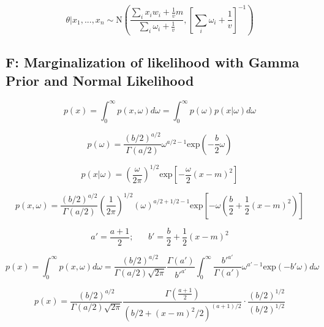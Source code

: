 \documentclass[12pt]{article}
\begin{document}
        \begin{equation}
            \theta|x_1,...,x_n \sim \text{N}\left( \frac{\sum_i x_i w_i + \frac{1}{v}m}{\sum_i \omega_i + \frac{1}{v}}, \left [ \sum_i \omega_i + \frac{1}{v}\right]^{-1}\right)
        \end{equation}


    \subsection*{F: Marginalization of likelihood with Gamma Prior and Normal Likelihood}

        \begin{equation}
              p(x) = \int_0^{\infty} p(x,\omega)d\omega = \int_0^{\infty} p(\omega)p(x|\omega)d\omega
        \end{equation}

        \begin{equation}
              p(\omega) = \frac{(b/2)^{a/2}}{\Gamma(a/2)}{\omega}^{a/2-1} \text{exp}\left (-\frac{b}{2}\omega \right)
        \end{equation}

        \begin{equation}
              p(x|\omega) = \left( \frac{\omega}{2 \pi}\right)^{1/2} \text{exp} \left [ -\frac{\omega}{2}(x - m)^2\right]
        \end{equation}

        \begin{equation}
              p(x,\omega) = \frac{(b/2)^{a/2}}{\Gamma(a/2)}  \left( \frac{1}{2 \pi}\right)^{1/2} (\omega)^{a/2+1/2-1}\text{exp}\left[-\omega \left( \frac{b}{2} + \frac{1}{2}(x - m)^2\right) \right]
        \end{equation}

        \begin{equation}
              a' = \frac{a+1}{2}; \hspace{20pt} b'= \frac{b}{2} + \frac{1}{2}(x-m)^2
        \end{equation}

        \begin{equation}
              p(x) = \int_0^{\infty}p(x, \omega) d\omega = \frac{(b/2)^{a/2}}{\Gamma(a/2) \sqrt{2\pi}} \frac{\Gamma(a')}{b'^{a'}} \int_0^{\infty} \frac{b'^{a'}}{\Gamma(a')}\omega^{a'-1} \text{exp}(-b' \omega) d\omega
        \end{equation}

        \begin{equation}
              p(x) = \frac{(b/2)^{a/2}}{\Gamma(a/2) \sqrt{2\pi}} \frac{\Gamma(\frac{a+1}{2})}{(b/2 + (x-m)^2/2)^{(a+1)/2}} \cdot \frac{(b/2)^{1/2}}{(b/2)^{1/2}}
        \end{equation}
\end{document}
